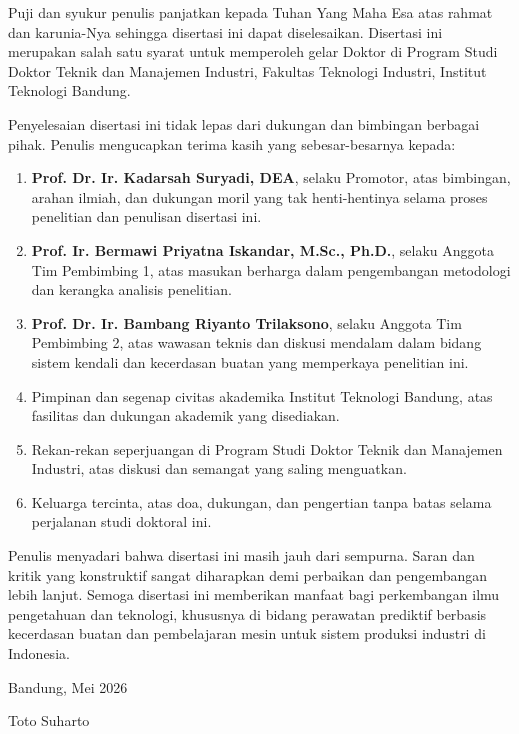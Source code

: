 
\begin{katapengantar}

Puji dan syukur penulis panjatkan kepada Tuhan Yang Maha Esa atas
rahmat dan karunia-Nya sehingga disertasi ini dapat diselesaikan.
Disertasi ini merupakan salah satu syarat untuk memperoleh gelar
Doktor di Program Studi Doktor Teknik dan Manajemen Industri, Fakultas
Teknologi Industri, Institut Teknologi Bandung.

Penyelesaian disertasi ini tidak lepas dari dukungan dan bimbingan
berbagai pihak.
Penulis mengucapkan terima kasih yang sebesar-besarnya kepada:

\begin{enumerate}
  \item \textbf{Prof. Dr. Ir. Kadarsah Suryadi, DEA}, selaku Promotor,
        atas bimbingan, arahan ilmiah, dan dukungan moril yang tak
        henti-hentinya selama proses penelitian dan penulisan disertasi ini.
  \item \textbf{Prof. Ir. Bermawi Priyatna Iskandar, M.Sc., Ph.D.},
        selaku Anggota Tim Pembimbing 1, atas masukan berharga dalam
        pengembangan metodologi dan kerangka analisis penelitian.
  \item \textbf{Prof. Dr. Ir. Bambang Riyanto Trilaksono}, selaku
        Anggota Tim Pembimbing 2, atas wawasan teknis dan diskusi
        mendalam dalam bidang sistem kendali dan kecerdasan buatan
        yang memperkaya penelitian ini.
  \item Pimpinan dan segenap civitas akademika Institut Teknologi Bandung,
        atas fasilitas dan dukungan akademik yang disediakan.
  \item Rekan-rekan seperjuangan di Program Studi Doktor Teknik dan
        Manajemen Industri, atas diskusi dan semangat yang saling
        menguatkan.
  \item Keluarga tercinta, atas doa, dukungan, dan pengertian tanpa
        batas selama perjalanan studi doktoral ini.
\end{enumerate}

Penulis menyadari bahwa disertasi ini masih jauh dari sempurna.
Saran dan kritik yang konstruktif sangat diharapkan demi perbaikan
dan pengembangan lebih lanjut.
Semoga disertasi ini memberikan manfaat bagi perkembangan ilmu
pengetahuan dan teknologi, khususnya di bidang perawatan prediktif
berbasis kecerdasan buatan dan pembelajaran mesin untuk sistem produksi
industri di Indonesia.

\vspace{1.5cm}
\begin{flushright}
Bandung, Mei 2026

\vspace{1.5cm}
Toto Suharto
\end{flushright}

\end{katapengantar}
